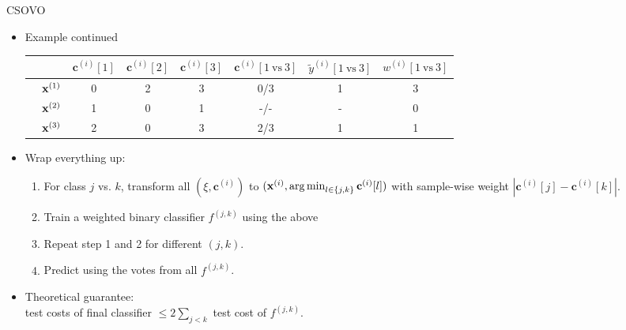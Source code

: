 \documentclass[11pt,compress,t,notes=noshow, aspectratio=169, xcolor=table]{beamer}
\newcommand{\cv}{\mathbf{c}}
\begin{document}
\begin{frame}{CSOVO}
    \begin{itemize}
    \item Example continued
    \begin{center}  
        \footnotesize{
            \begin{tabular}{cc|ccc|ccc}
                & & $\cv^{(i)}[1]$ & $\cv^{(i)}[2]$ & $\cv^{(i)}[3]$ & $\cv^{(i)}[1 \ \text{vs} \ 3]$ & $\tilde{y}^{( i)}[1 \ \text{vs} \ 3]$ & $w^{(i)}[1 \ \text{vs} \ 3]$\\
                \hline & $\mathbf{x}^{(1)}$ & 0 & 2 & 3 & 0/3 & 1 & 3\\
                & $\mathbf{x}^{(2)}$ & 1 & 0 & 1 & -/- & - & 0 \\
                & $\mathbf{x}^{(3)}$ & 2 & 0 & 3 & 2/3 & 1 & 1\\
            \end{tabular}
        }
    \end{center}

    \item Wrap everything up:
    \begin{enumerate}
        \item For class $j$ vs. $k$, transform all $(\xi, \cv^{(i)})$ to $(\xi, \argmin_{l \in \{j, k\}} \cv^{(i)}[l])$ with sample-wise weight $|\cv^{(i)}[j] - \cv^{(i)}[k]|$.
        
        \item Train a weighted binary classifier $f^{(j, k)}$ using the above
        
        \item Repeat step 1 and 2 for different $(j, k)$.
        
        \item Predict using the votes from all $f^{(j, k)}$.
    \end{enumerate}

    \item Theoretical guarantee:\\ 
    test costs of final classifier $\leq 2\sum_{j < k}$ test cost of $f^{(j, k)}$. 
    \end{itemize}
\end{frame}
\end{document}
